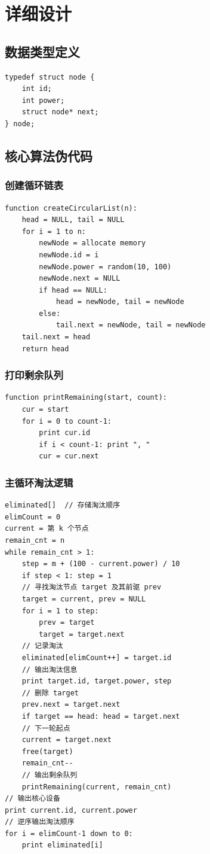 \documentclass[UTF8]{ctexart}
\begin{document}
\section{详细设计}

\subsection{数据类型定义}
\begin{lstlisting}
typedef struct node {
    int id;
    int power;
    struct node* next;
} node;
\end{lstlisting}

\subsection{核心算法伪代码}

\subsubsection{创建循环链表}
\begin{lstlisting}
function createCircularList(n):
    head = NULL, tail = NULL
    for i = 1 to n:
        newNode = allocate memory
        newNode.id = i
        newNode.power = random(10, 100)
        newNode.next = NULL
        if head == NULL:
            head = newNode, tail = newNode
        else:
            tail.next = newNode, tail = newNode
    tail.next = head
    return head
\end{lstlisting}

\subsubsection{打印剩余队列}
\begin{lstlisting}
function printRemaining(start, count):
    cur = start
    for i = 0 to count-1:
        print cur.id
        if i < count-1: print ", "
        cur = cur.next
\end{lstlisting}

\subsubsection{主循环淘汰逻辑}
\begin{lstlisting}
eliminated[]  // 存储淘汰顺序
elimCount = 0
current = 第 k 个节点
remain_cnt = n
while remain_cnt > 1:
    step = m + (100 - current.power) / 10
    if step < 1: step = 1
    // 寻找淘汰节点 target 及其前驱 prev
    target = current, prev = NULL
    for i = 1 to step:
        prev = target
        target = target.next
    // 记录淘汰
    eliminated[elimCount++] = target.id
    // 输出淘汰信息
    print target.id, target.power, step
    // 删除 target
    prev.next = target.next
    if target == head: head = target.next
    // 下一轮起点
    current = target.next
    free(target)
    remain_cnt--
    // 输出剩余队列
    printRemaining(current, remain_cnt)
// 输出核心设备
print current.id, current.power
// 逆序输出淘汰顺序
for i = elimCount-1 down to 0:
    print eliminated[i]
\end{lstlisting}
\end{document}
